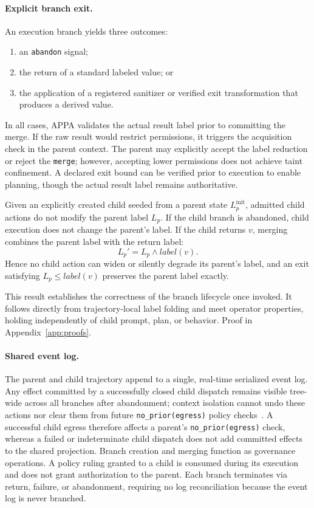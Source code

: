 \paragraph{Explicit branch exit.}
An execution branch yields three outcomes:
\begin{enumerate}
  \item an \texttt{abandon} signal;
  \item the return of a standard labeled value; or
  \item the application of a registered sanitizer or verified exit transformation that produces a derived value.
\end{enumerate}
In all cases, APPA validates the actual result label prior to committing the merge. If the raw result would restrict permissions, it triggers the acquisition check in the parent context. The parent may explicitly accept the label reduction or reject the \texttt{merge}; however, accepting lower permissions does not achieve taint confinement. A declared exit bound can be verified prior to execution to enable planning, though the actual result label remains authoritative.

\begin{theorem}\label{thm:branch}
Given an explicitly created child seeded from a parent state $L_p^{\mathrm{init}}$, admitted child actions do not modify the parent label $L_p$. If the child branch is abandoned, child execution does not change the parent's label. If the child returns $v$, merging combines the parent label with the return label:
\[
  L_p' = L_p \wedge \mathit{label}(v).
\]
Hence no child action can widen or silently degrade its parent's label, and an exit satisfying $L_p \le \mathit{label}(v)$ preserves the parent label exactly.
\end{theorem}

This result establishes the correctness of the branch lifecycle once invoked. It follows directly from trajectory-local label folding and meet operator properties, holding independently of child prompt, plan, or behavior. Proof in Appendix~\ref{app:proofs}.

\paragraph{Shared event log.}
The parent and child trajectory append to a single, real-time serialized event log. Any effect committed by a successfully closed child dispatch remains visible tree-wide across all branches after abandonment; context isolation cannot undo these actions nor clear them from future \texttt{no\_prior(egress)} policy checks~\cite{wangAgentTracesTrust2026}. A successful child egress therefore affects a parent's \texttt{no\_prior(egress)} check, whereas a failed or indeterminate child dispatch does not add committed effects to the shared projection. Branch creation and merging function as governance operations. A policy ruling granted to a child is consumed during its execution and does not grant authorization to the parent. Each branch terminates via return, failure, or abandonment, requiring no log reconciliation because the event log is never branched.

